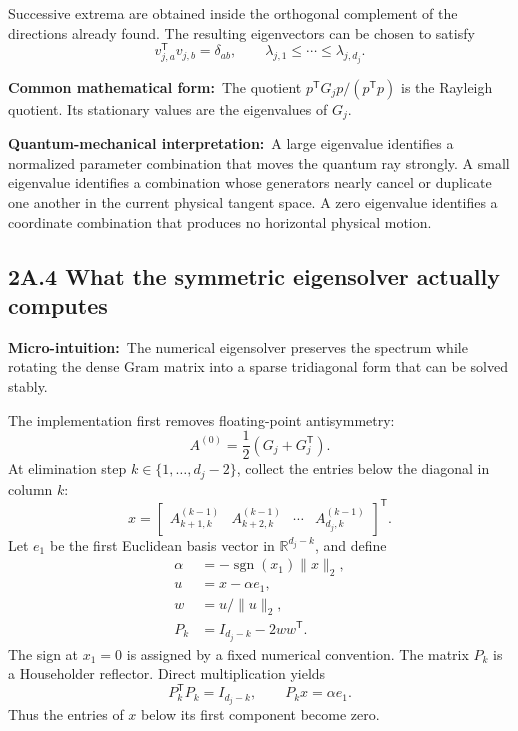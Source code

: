 \documentclass[10pt,twocolumn]{article}
\newcommand{\micro}[1]{\par\noindent\textbf{Micro-intuition:}\ #1\par}
\newcommand{\form}[1]{\par\noindent\textbf{Common mathematical form:}\ #1\par}
\newcommand{\phys}[1]{\par\noindent\textbf{Quantum-mechanical interpretation:}\ #1\par}
\newcommand{\conceptbreak}{\par\medskip\noindent{\color{black!30}\rule{\columnwidth}{0.35pt}}\par\medskip}
\begin{document}
Successive extrema are obtained inside the orthogonal complement of the
directions already found. The resulting eigenvectors can be chosen to satisfy
\begin{equation}
v_{j,a}^{\mathsf T}v_{j,b}=\delta_{ab},
\qquad
\lambda_{j,1}\leq\cdots\leq\lambda_{j,d_j}.
\label{eq:bridge-eigenpair-order}
\end{equation}

\form{The quotient
\(p^{\mathsf T}G_jp/(p^{\mathsf T}p)\) is the Rayleigh quotient. Its
stationary values are the eigenvalues of \(G_j\).}

\phys{A large eigenvalue identifies a normalized parameter combination that
moves the quantum ray strongly. A small eigenvalue identifies a combination
whose generators nearly cancel or duplicate one another in the current
physical tangent space. A zero eigenvalue identifies a coordinate combination
that produces no horizontal physical motion.}

\conceptbreak

\subsection*{2A.4 What the symmetric eigensolver actually computes}

\micro{The numerical eigensolver preserves the spectrum while rotating the
dense Gram matrix into a sparse tridiagonal form that can be solved stably.}

The implementation first removes floating-point antisymmetry:
\begin{equation}
A^{(0)}=\frac12(G_j+G_j^{\mathsf T}).
\label{eq:bridge-numerical-symmetrization}
\end{equation}
At elimination step \(k\in\{1,\ldots,d_j-2\}\), collect the entries below the
diagonal in column \(k\):
\begin{equation}
x=
\begin{bmatrix}
A^{(k-1)}_{k+1,k}&
A^{(k-1)}_{k+2,k}&
\cdots&
A^{(k-1)}_{d_j,k}
\end{bmatrix}^{\mathsf T}.
\label{eq:bridge-householder-column}
\end{equation}
Let \(e_1\) be the first Euclidean basis vector in
\(\mathbb R^{d_j-k}\), and define
\begin{align}
\alpha&=-\operatorname{sgn}(x_1)\|x\|_2,
\label{eq:bridge-householder-alpha}\\
u&=x-\alpha e_1,
\label{eq:bridge-householder-u}\\
w&=u/\|u\|_2,
\label{eq:bridge-householder-w}\\
P_k&=I_{d_j-k}-2ww^{\mathsf T}.
\label{eq:bridge-householder-reflector}
\end{align}
The sign at \(x_1=0\) is assigned by a fixed numerical convention. The matrix
\(P_k\) is a Householder reflector. Direct multiplication yields
\begin{equation}
P_k^{\mathsf T}P_k=I_{d_j-k},
\qquad
P_kx=\alpha e_1.
\label{eq:bridge-householder-action}
\end{equation}
Thus the entries of \(x\) below its first component become zero.
\end{document}
